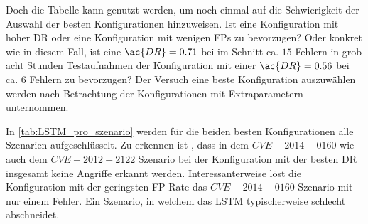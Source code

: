     Doch die Tabelle kann genutzt werden, um noch einmal auf die Schwierigkeit der Auswahl der besten Konfigurationen hinzuweisen.
    Ist eine Konfiguration mit hoher \ac{DR} oder eine Konfiguration mit wenigen \acp{FP} zu bevorzugen?
    Oder konkret wie in diesem Fall, ist eine $\ac{DR}=0.71$ bei im Schnitt ca. $15$ Fehlern in grob acht Stunden Testaufnahmen der Konfiguration mit einer $\ac{DR}=0.56$ bei ca. $6$ Fehlern zu bevorzugen?
    Der Versuch eine beste Konfiguration auszuwählen werden nach Betrachtung der Konfigurationen mit Extraparametern unternommen.\par\medskip

    In \autoref{tab:LSTM_pro_szenario} werden für die beiden besten Konfigurationen alle Szenarien aufgeschlüsselt.
    Zu erkennen ist , dass in dem $CVE-2014-0160$ wie auch dem $CVE-2012-2122$ Szenario bei der Konfiguration mit der besten \ac{DR} insgesamt keine Angriffe erkannt werden. 
    Interessanterweise löst die Konfiguration mit der geringsten \ac{FP}-Rate das $CVE-2014-0160$ Szenario mit nur einem Fehler.
    Ein Szenario, in welchem das \ac{LSTM} typischerweise schlecht abschneidet.\par\medskip
